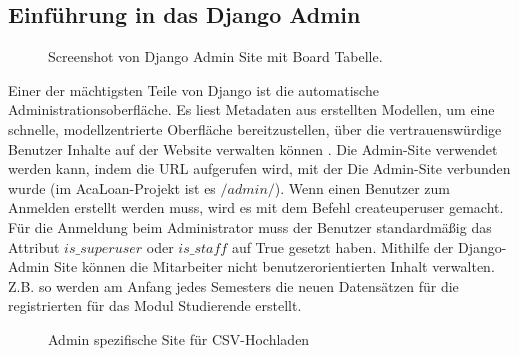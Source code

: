 \subsection{Einführung in das Django Admin}
\label{sec:server:admin}
\begin{figure}
	\centering
	\caption{Screenshot von Django Admin Site mit Board Tabelle.}
	\label{fig:django_admin}
\end{figure}
Einer der mächtigsten Teile von Django ist die automatische Administrationsoberfläche. Es liest Metadaten aus erstellten Modellen, um eine schnelle, modellzentrierte Oberfläche bereitzustellen, über die vertrauenswürdige Benutzer Inhalte auf der Website verwalten können \cite{website:djangoAdmin}. Die Admin-Site verwendet werden kann, indem die URL aufgerufen wird, mit der Die Admin-Site verbunden wurde (im AcaLoan-Projekt ist es $/admin/$). Wenn einen Benutzer zum Anmelden erstellt werden muss, wird es mit dem Befehl createuperuser gemacht. Für die Anmeldung beim Administrator muss der Benutzer standardmäßig das Attribut $is\_superuser$ oder $is\_staff$ auf True gesetzt haben. Mithilfe der Django-Admin Site können die Mitarbeiter nicht benutzerorientierten Inhalt verwalten. Z.B. so werden am Anfang jedes Semesters die neuen Datensätzen für die registrierten für das Modul Studierende erstellt. 
\begin{figure}
	\caption{Admin spezifische Site für CSV-Hochladen}
	\label{fig:upload_csv}
\end{figure}
